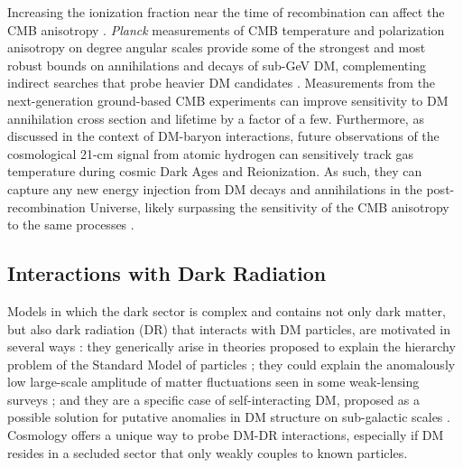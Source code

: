 \documentclass[12pt]{article}
\begin{document}
Increasing the ionization fraction near the time of recombination can affect the CMB anisotropy \cite{Adams:1998nr,Chen:2003gz, Padmanabhan:2005es}. 
\textit{Planck} measurements of CMB temperature and polarization anisotropy on degree angular scales provide some of the strongest and most robust bounds on annihilations and decays of sub-GeV DM, complementing indirect searches that probe heavier DM candidates \cite{Aghanim:2018eyx,Slatyer:2016qyl}. 
Measurements from the next-generation ground-based CMB experiments can improve sensitivity to DM annihilation cross section and lifetime by a factor of a few.
Furthermore, as discussed in the context of DM-baryon interactions, future observations of the cosmological 21-cm signal from atomic hydrogen can sensitively track gas temperature during cosmic Dark Ages and Reionization.
As such, they can capture any new energy injection from DM decays and annihilations in the post-recombination Universe, likely surpassing the sensitivity of the CMB anisotropy to the same processes \cite{Furlanetto:2006wp,Valdes:2007cu,Evoli:2014pva,Lopez-Honorez:2016sur,Poulin:2016anj}. 

\vspace{-0.4cm}
\subsection{Interactions with Dark Radiation}

Models in which the dark sector is complex and contains not only dark matter, but also dark radiation (DR) that interacts with DM particles, are motivated in several ways \cite{2016arXiv160808632A}: they generically arise in theories proposed to explain the hierarchy problem of the Standard Model of particles \cite{Arkani-Hamed:2016rle, Chacko:2018vss}; they could explain the anomalously low large-scale amplitude of matter fluctuations seen in some weak-lensing surveys \cite{Lesgourgues:2015wza,Chacko:2016kgg,Buen-Abad:2017gxg,Krall:2017xcw}; and they are a specific case of self-interacting DM, proposed as a possible solution for putative anomalies in DM structure on sub-galactic scales \cite{Tulin:2012wi,Tulin:2013teo,Kaplinghat:2015aga,Bullock:2017xww}. 
Cosmology offers a unique way to probe DM-DR interactions, especially if DM resides in a secluded sector that only weakly couples to known particles.
\end{document}
